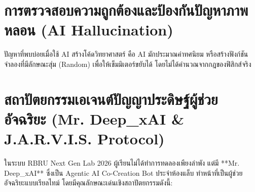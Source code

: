 \section{การตรวจสอบความถูกต้องและป้องกันปัญหาภาพหลอน (AI Hallucination)}
ปัญหาที่พบบ่อยเมื่อใช้ AI สร้างโค้ดวิทยาศาสตร์ คือ AI มักประมาณค่าทศนิยม หรือสร้างฟังก์ชันจำลองที่มีลักษณะสุ่ม (Random) เพื่อให้เข็มมิเตอร์ขยับได้ โดยไม่ได้คำนวณจากกฎของฟิสิกส์จริง

\section{สถาปัตยกรรมเอเจนต์ปัญญาประดิษฐ์ผู้ช่วยอัจฉริยะ (Mr. Deep\_xAI \& J.A.R.V.I.S. Protocol)}
ในระบบ RBRU Next Gen Lab 2026 ผู้เรียนไม่ได้ทำการทดลองเพียงลำพัง แต่มี **Mr. Deep\_xAI** ซึ่งเป็น Agentic AI Co-Creation Bot ประจำห้องแล็บ ทำหน้าที่เป็นผู้ช่วยอัจฉริยะแบบเรียลไทม์ โดยมีคุณลักษณะเด่นเชิงสถาปัตยกรรมดังนี้:


